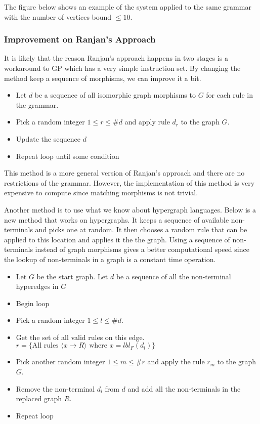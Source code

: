   The figure below shows an example of the system applied to the same grammar with the number of vertices bound $\leq 10$.
  


  \subsubsection{Improvement on Ranjan's Approach}

    It is likely that the reason Ranjan's approach happens in two stages is a workaround to GP which has a very simple instruction set. By changing the method keep a sequence of morphisms, we can improve it a bit.

    \begin{itemize}
    \item Let $d$ be a sequence of all isomorphic graph morphisms to $G$ for each rule in the grammar.
    \item Pick a random integer $1 \leq r \leq \#d$ and apply rule $d_r$ to the graph $G$.
    \item Update the sequence $d$
    \item Repeat loop until some condition
    \end{itemize}

    This method is a more general version of Ranjan's approach and there are no restrictions of the grammar. However, the implementation of this method is very expensive to compute since matching morphisms is not trivial.

    Another method is to use what we know about hypergraph languages. Below is a new method that works on hypergraphs. It keeps a sequence of available non-terminals and picks one at random. It then chooses a random rule that can be applied to this location and applies it the the graph. Using a sequence of non-terminals instead of graph morphisms gives a better computational speed since the lookup of non-terminals in a graph is a constant time operation.

    \begin{itemize}
    \item Let $G$ be the start graph. Let $d$ be a sequence of all the non-terminal hyperedges in $G$
    \item Begin loop
    \item Pick a random integer $1 \leq l \leq \#d$.
    \item Get the set of all valid rules on this edge. $r = \{\textrm{All rules $\langle x \to R \rangle$ where $x = lbl_F(d_l)$\}}$
    \item Pick another random integer $1 \leq m \leq \#r$ and apply the rule $r_m$ to the graph $G$.
    \item Remove the non-terminal $d_l$ from $d$ and add all the non-terminals in the replaced graph $R$.
    \item Repeat loop
    \end{itemize}

